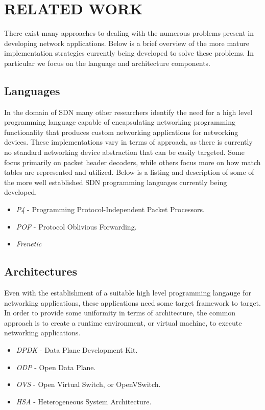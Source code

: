 \chapter{RELATED WORK}
\label{related}

There exist many approaches to dealing with the numerous problems present in
developing network applications. Below is a brief overview of the more mature implementation strategies currently being developed to solve these problems. In
particular we focus on the language and architecture components.

\section{Languages}
In the domain of SDN many other researchers identify the need for a high level
programming language capable of encapsulating networking programming 
functionality that produces custom networking applications for networking 
devices. These implementations vary in terms of approach, as there is currently
no standard networking device abstraction that can be easily targeted. Some 
focus primarily on packet header decoders, while others focus more on how match
tables are represented and utilized. Below is a listing and description of 
some of the more well established SDN programming languages currently being
developed. 
\begin{itemize}
\item \emph{P4} - Programming Protocol-Independent Packet Processors.
\item \emph{POF} - Protocol Oblivious Forwarding.
\item \emph{Frenetic}
\end{itemize}

\section{Architectures}
Even with the establishment of a suitable high level programming langauge for
networking applications, these applications need some target framework to 
target. In order to provide some uniformity in terms of architecture, the 
common approach is to create a runtime environment, or virtual machine, to 
execute networking applications. 
\begin{itemize}
\item \emph{DPDK} - Data Plane Development Kit.
\item \emph{ODP} - Open Data Plane.
\item \emph{OVS} - Open Virtual Switch, or OpenVSwitch.
\item \emph{HSA} - Heterogeneous System Architecture.
\end{itemize}